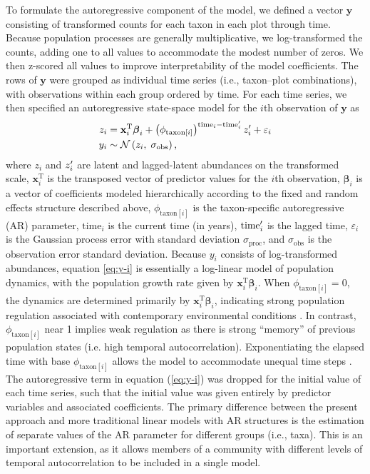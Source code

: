 To formulate the autoregressive component of the model, we defined a vector $\mathbf{y}$
consisting of transformed counts for each taxon in each plot through time.
Because population processes are generally multiplicative, we log-transformed the counts,
adding one to all values to accommodate the modest number of zeros.
We then z-scored all values to improve interpretability of the model coefficients.
The rows of $\mathbf{y}$ were grouped as individual time series
(i.e., taxon--plot combinations), with observations within each group ordered by time.
For each time series, we then specified an autoregressive state-space model 
for the $i$th observation of $\mathbf{y}$ as
%
\begin{equation} \label{eq:y-i}
\begin{split}
    z_i &= \mathbf{x}_i^\text{T} {\boldsymbol\beta}_i +
        \left( \phi_{\text{taxon}[i]} \right)^{\text{time}_i - \text{time}\sp{\prime}_i}
        z\sp{\prime}_i + \varepsilon_i \\
    y_i &\sim \mathcal{N} \left(z_i, \; \sigma_{\text{obs}} \right)
    \text{,}
\end{split}
\end{equation}
%
\noindent where $z_i$ and $z\sp{\prime}_i$ are latent and lagged-latent abundances on the transformed scale,
$\mathbf{x}_i^\text{T}$ is the transposed vector
of predictor values for the $i$th observation,
${\boldsymbol\beta}_i$ is a vector of coefficients 
modeled hierarchically according to the fixed and random effects structure described above,
$\phi_{\text{taxon}[i]}$ is the taxon-specific autoregressive (AR) parameter,
$\text{time}_i$ is the current time (in years),
$\text{time}\sp{\prime}_i$ is the lagged time,
$\varepsilon_i$  is the Gaussian process error 
with standard deviation $\sigma_{\text{proc}}$,
and $\sigma_{\text{obs}}$ is the observation error standard deviation.
Because $y_i$ consists of log-transformed abundances, equation \ref{eq:y-i} is
essentially a log-linear model of population dynamics, with the population growth rate given by
$\mathbf{x}_i^\text{T} {\boldsymbol\beta}_i$.
When $\phi_{\text{taxon}[i]} = 0$,
the dynamics are determined primarily by $\mathbf{x}_i^\text{T} {\boldsymbol\beta}_i$,
indicating strong population regulation associated with contemporary environmental conditions \citep{Ives2010, Ziebarth2010}.
In contrast, $\phi_{\text{taxon}[i]}$ near 1 implies weak regulation as there is strong 
``memory'' of previous population states (i.e. high temporal autocorrelation).
Exponentiating the elapsed time with base $\phi_{\text{taxon}[i]}$ allows the model
to accommodate unequal time steps \citep{Zuur2009}.
The autoregressive term in equation (\ref{eq:y-i}) was dropped for the initial value of each time series,
such that the initial value was given entirely by predictor variables and associated coefficients.
The primary difference between the present approach and more traditional linear models
with AR structures \citep[e.g.,][]{Zuur2009} is the estimation of separate values of the AR
parameter for different groups (i.e., taxa).
This is an important extension, as it allows members of a community with
different levels of temporal autocorrelation to be included in a single model.



